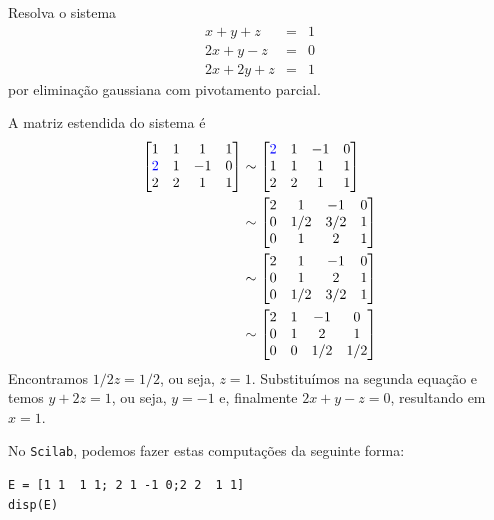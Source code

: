 \begin{ex} Resolva o sistema
\begin{eqnarray*}
  x+y+z  &=& 1\\
  2x+y-z &=& 0\\
  2x+2y+z &=& 1
\end{eqnarray*}
por eliminação gaussiana com pivotamento parcial.
\end{ex}
\begin{sol}
A matriz estendida do sistema é
\begin{equation*}
  \begin{split}
    \begin{bmatrix}
      1 &1&  1&1\\
      {\color{blue}{2}} &1& -1&0\\
      2 & 2 &1&1
    \end{bmatrix}
    &\sim
    \begin{bmatrix}
      {\color{blue}{2}} &1& -1&0\\
      1 &1&  1&1\\
      2 &2&  1&1
    \end{bmatrix}\\
    &\sim
    \begin{bmatrix}
      2 &1& -1&0\\
      0 &1/2& 3/2&1\\
      0 & 1 &2&1
    \end{bmatrix}\\
    &\sim
    \begin{bmatrix}
      2 &1& -1&0\\
      0 & 1 &2&1\\
      0 &1/2& 3/2&1
    \end{bmatrix}\\
    &\sim
    \begin{bmatrix}
      2 &1& -1&0\\
      0 & 1 &2&1\\
      0 &0& 1/2&1/2
    \end{bmatrix}
  \end{split}
\end{equation*}
Encontramos $1/2z=1/2$, ou seja, $z=1$. Substituímos na segunda equação e temos $y+2z=1$, ou seja, $y=-1$ e, finalmente $2x+y-z=0$, resultando em $x=1$.

\ifisscilab
No \verb+Scilab+, podemos fazer estas computações da seguinte forma:
\begin{verbatim}
E = [1 1  1 1; 2 1 -1 0;2 2  1 1]
disp(E)


\end{verbatim}
\end{sol}
